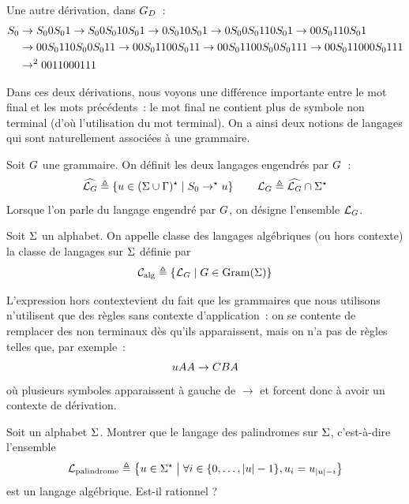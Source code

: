 Une autre dérivation, dans $G_D$~:
\begin{align*}
  S_{0} &\to S_{0} 0S_{0} 1 \to S_{0} 0S_{0} 10S_{0} 1 \to 0S_{0} 10S_{0} 1
  \to 0S_{0} 0S_{0} 110S_{0} 1 \to 00S_{0} 110S_{0} 1 \\
  &\to 00S_{0} 110S_{0} 0S_{0} 11 \to 00S_{0} 1100S_{0} 11
  \to 00S_{0} 1100S_{0} 0S_{0} 111\to 00S_{0} 11000S_{0} 111\\
  &\to^2 0011000111
\end{align*}

Dans ces deux dérivations, nous voyons une différence importante entre le mot
final et les mots précédents~: le mot final ne contient plus de symbole non
terminal (d'où l'utilisation du mot \og terminal\fg). On a ainsi deux notions de
langages qui sont naturellement associées à une grammaire.

\begin{definition}
  Soit $G$ une grammaire. On définit les deux langages engendrés par
  $G$~:
  \[\widehat{\mathcal L_{G}}\triangleq
  \left\{ u \in (\Sigma\cup\Gamma)^{\star} \;\middle\vert\; S_{0}\to^{\mathord{\star}} u \right\} \qquad
  \mathcal L_{G} \triangleq \widehat{\mathcal L_{G}}\cap \Sigma^{\star}\]
  Lorsque l'on parle du langage engendré par $G$, on désigne l'ensemble
  $\mathcal L_{G}$.
\end{definition}

\begin{definition}
  Soit $\Sigma$ un alphabet. On appelle classe des langages algébriques (ou hors
  contexte) la classe de langages sur $\Sigma$ définie par
  \[\mathcal{C}_{\operatorname{alg}}\triangleq \left\{ \mathcal L_{G} \;\middle\vert\; G\in\operatorname{Gram}(\Sigma) \right\}\]
\end{definition}

\begin{remark}
  L'expression \og hors contexte\fg vient du fait que les grammaires que nous
  utilisons n'utilisent que des règles sans contexte d'application~: on se
  contente de remplacer des non terminaux dès qu'ils apparaissent, mais on n'a
  pas de règles telles que, par exemple~:
  \[uAA \to CBA\]
  où plusieurs symboles apparaissent à gauche de $\to$ et forcent donc à avoir
  un contexte de dérivation.
\end{remark}

\begin{exercise}
  Soit un alphabet $\Sigma$. Montrer que le langage des palindromes sur $\Sigma$,
  c'est-à-dire l'ensemble
  \[\mathcal L_{\operatorname{palindrome}} \triangleq
  \left\{ u \in \Sigma^{\star} \;\middle\vert\; \forall i \in \{0,\ldots,\left|u\right| - 1\},u_i = u_{\left|u\right| - i} \right\}\]
  est un langage algébrique. Est-il rationnel ?
\end{exercise}

